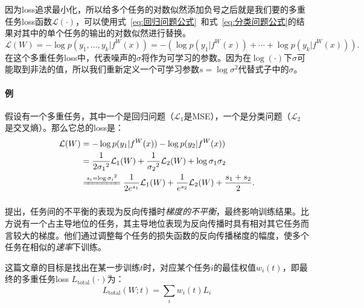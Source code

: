 \documentclass{ctexart}
\begin{document}
因为loss追求最小化，所以给多个任务的对数似然添加负号之后就是我们要的多重任务loss函数$\mathcal{L}(\cdot)$，可以使用式~\ref{eq:回归问题公式}~和式~\ref{eq:分类问题公式}的结果对其中的单个任务的输出的对数似然进行替换。
\begin{equation}
    \mathcal{L}(W) = - \log p(y_1, \ldots, y_k|f^W(x)) = - (\log p(y_1 | f^W(x)) + \cdots + \log p(y_k | f^W(x))).
\end{equation}
在这个多重任务loss中，代表噪声的$\sigma$将作为可学习的参数。因为在$\log(\cdot)$下$\sigma$可能取到非法的值，所以我们重新定义一个可学习参数$s=\log \sigma^2$代替式子中的$\sigma$。

\paragraph{例} 假设有一个多重任务，其中一个是回归问题（$\mathcal{L}_1$是MSE），一个是分类问题（$\mathcal{L}_2$是交叉熵）。那么它总的loss是：
\begin{equation}
    \begin{aligned}
        \mathcal{L}(W) &= - \log p(y_1|f^W(x)) - \log p(y_2|f^W(x)) \\
         &= \frac{1}{2{\sigma_1}^2} \mathcal{L}_1(W) + \frac{1}{{\sigma_2}^2} \mathcal{L}_2(W) + \log \sigma_1\sigma_2 \\
         &\xlongequal{s_i =\log {\sigma_i}^2} \frac{1}{2{e}^{s_1}} \mathcal{L}_1(W) + \frac{1}{{e}^{s_2}} \mathcal{L}_2(W) + \frac{s_1 + s_2}{2}.
    \end{aligned}
\end{equation}

\subsubsection{}

\citet{Chen18GradNorm}提出，任务间的不平衡的表现为反向传播时\emph{梯度的不平衡}，最终影响训练结果。比方说有一个占主导地位的任务，其主导地位表现为反向传播时具有相对其它任务而言较大的梯度。他们通过调整每个任务的损失函数的反向传播梯度的幅度，使多个任务在相似的\emph{速率}下训练。

这篇文章的目标是找出在某一步训练$t$时，对应某个任务$i$的最佳权值$w_i(t)$，即最终的多重任务loss $L_\mathrm{total}(\cdot)$为：
\begin{equation}
    L_\mathrm{total}(W;t) = \sum_i w_i(t) L_i
\end{equation}

\subsubsection{}
\end{document}
